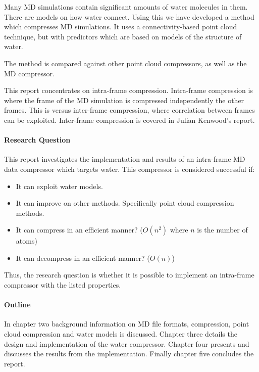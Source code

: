 \documentclass[a4paper]{report}
\begin{document}
Many MD simulations contain significant amounts of water molecules in
them. There are models on how water connect. Using this we have developed a
method which compresses MD simulations. It uses a connectivity-based point
cloud technique, but with predictors which are based on models of the
structure of water.

The method is compared against other point cloud compressors, as well as the
\citet{omeltchenko2000sls} MD compressor.

This report concentrates on intra-frame compression. Intra-frame compression
is where the frame of the MD simulation is compressed independently the other
frames. This is versus inter-frame compression, where correlation between
frames can be exploited. Inter-frame compression is covered in Julian
Kenwood's report.

\paragraph{Research Question}

This report investigates the implementation and results of an intra-frame MD
data compressor which targets water. This compressor is considered successful if:

\begin{itemize}
  \item It can exploit water models.
  \item It can improve on other methods. Specifically point cloud compression
    methods.
  \item It can compress in an efficient manner? ($O(n^2)$ where $n$ is the
    number of atoms)
  \item It can decompress in an efficient manner? ($O(n)$)
\end{itemize}

Thus, the research question is whether it is possible to implement an
intra-frame compressor with the listed properties.


\paragraph{Outline}

In chapter two background information on MD file formats, compression, point
cloud compression and water models is discussed. Chapter three details the
design and implementation of the water compressor. Chapter four presents and
discusses the results from the implementation. Finally chapter five concludes
the report.
\end{document}
